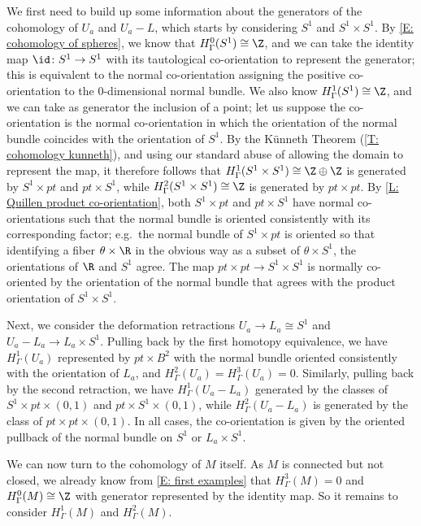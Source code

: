 \begin{example}
We first need to build up some information about the generators of the cohomology of $U_a$ and $U_a - L$, which starts by considering $S^1$ and $S^1 \times S^1$.
By \cref{E: cohomology of spheres}, we know that $H^0_\Gamma(S^1) \cong \Z$, and we can take the identity map $\id \colon S^1 \to S^1$ with its tautological co-orientation to represent the generator; this is equivalent to the normal co-orientation assigning the positive co-orientation to the $0$-dimensional normal bundle.
We also know $H^1_\Gamma(S^1) \cong \Z$, and we can take as generator the inclusion of a point; let us suppose the co-orientation is the normal co-orientation in which the orientation of the normal bundle coincides with the orientation of $S^1$.
By the K\"unneth Theorem (\cref{T: cohomology kunneth}), and using our standard abuse of allowing the domain to represent the map, it therefore follows that $H^1_\Gamma(S^1 \times S^1) \cong \Z \oplus \Z$ is generated by $S^1 \times pt$ and $pt \times S^1$, while $H^2_\Gamma(S^1 \times S^1) \cong \Z$ is generated by $pt \times pt$.
By \cref{L: Quillen product co-orientation}, both $S^1 \times pt$ and $pt \times S^1$ have normal co-orientations such that the normal bundle is oriented consistently with its corresponding factor; e.g.\ the normal bundle of $S^1 \times pt$ is oriented so that identifying a fiber $\theta \times \R$ in the obvious way as a subset of $\theta \times S^1$, the orientations of $\R$ and $S^1$ agree.
The map $pt \times pt \to S^1 \times S^1$ is normally co-oriented by the orientation of the normal bundle that agrees with the product orientation of $S^1 \times S^1$.

Next, we consider the deformation retractions $U_a \to L_a \cong S^1$ and $U_a - L_a \to L_a \times S^1$.
Pulling back by the first homotopy equivalence, we have $H^1_\Gamma(U_a)$ represented by $pt \times B^2$ with the normal bundle oriented consistently with the orientation of $L_a$, and  $H^2_\Gamma(U_a) = H^3_\Gamma(U_a) = 0$. Similarly, pulling back by the second retraction, we have $H^1_\Gamma(U_a - L_a)$ generated by the classes of $S^1 \times pt \times (0,1)$ and $pt \times S^1 \times (0,1)$, while $H^2_\Gamma(U_a - L_a)$ is generated by the class of $pt \times pt \times (0,1)$.
In all cases, the co-orientation is given by the oriented pullback of the normal bundle on $S^1$ or $L_a \times S^1$.

We can now turn to the cohomology of $M$ itself.
As $M$ is connected but not closed, we already know from \cref{E: first examples} that $H^3_\Gamma(M) = 0$ and $H^0_\Gamma(M) \cong \Z$ with generator represented by the identity map.
So it remains to consider $H^1_\Gamma(M)$ and $H^2_\Gamma(M)$.


\end{example}
